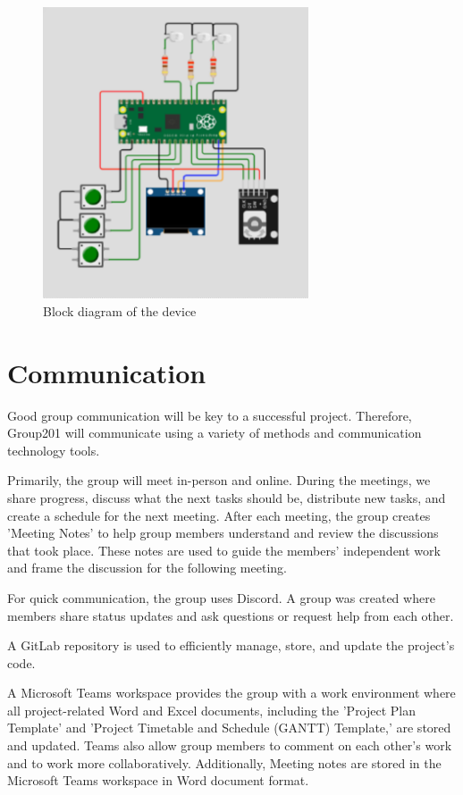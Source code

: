 \documentclass{article}
\begin{document}
\begin{figure}[h]
  \centering
  \includegraphics[width=0.7\textwidth]{project_diagram.png}
  \caption{Block diagram of the device}
  \label{diagram}
\end{figure}


\section{Communication}
Good group communication will be key to a successful project. Therefore, Group201 will communicate using a variety of methods and communication technology tools.

Primarily, the group will meet in-person and online. During the meetings, we share progress, discuss what the next tasks should be, distribute new tasks, and create a schedule for the next meeting. After each meeting, the group creates 'Meeting Notes' to help group members understand and review the discussions that took place. These notes are used to guide the members’ independent work and frame the discussion for the following meeting.

For quick communication, the group uses Discord. A group was created where members share status updates and ask questions or request help from each other.

A GitLab repository is used to efficiently manage, store, and update the project’s code.

A Microsoft Teams workspace provides the group with a work environment where all project-related Word and Excel documents, including the 'Project Plan Template' and 'Project Timetable and Schedule (GANTT) Template,' are stored and updated. Teams also allow group members to comment on each other’s work and to work more collaboratively. Additionally, Meeting notes are stored in the Microsoft Teams workspace in Word document format.
\end{document}

